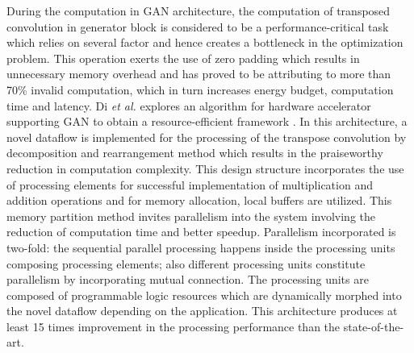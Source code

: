 \documentclass[journal]{IEEEtran}
\begin{document}
\par During the computation in GAN architecture, the computation of transposed convolution in generator block is considered to be a performance-critical task which relies on several factor and hence creates a bottleneck in the optimization problem. This operation exerts the use of zero padding which results in unnecessary memory overhead and has proved to be attributing to more than 70\% invalid computation, which in turn increases energy budget, computation time and latency. Di \textit{et al.} explores an algorithm for hardware accelerator supporting GAN to obtain a resource-efficient framework \cite{paper40}. In this architecture, a novel dataflow is implemented for the processing of the transpose convolution by decomposition and rearrangement method which results in the praiseworthy reduction in computation complexity. This design structure incorporates the use of processing elements for successful implementation of multiplication and addition operations and for memory allocation, local buffers are utilized. This memory partition method invites parallelism into the system involving the reduction of computation time and better speedup. Parallelism incorporated is two-fold: the sequential parallel processing happens inside the processing units composing processing elements; also different processing units constitute parallelism by incorporating mutual connection. The processing units are composed of programmable logic resources which are dynamically morphed into the novel dataflow depending on the application. This architecture produces at least 15 times improvement in the processing performance than the state-of-the-art.  
\end{document}
